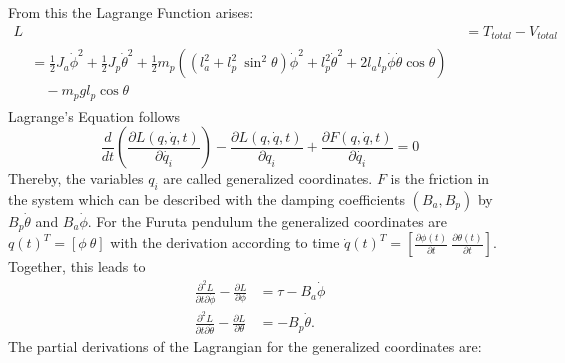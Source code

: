 From this the Lagrange Function arises:
\begin{align*}
L &=T_{total}-V_{total}\\
\begin{split}&=\frac{1}{2}J_a\dot{\phi}^2+\frac{1}{2}J_p\dot{\theta}^2+\frac{1}{2}m_p\left((l_a^2+l_p^2\
\sin^2\theta)\dot{\phi}^2+l_p^2\dot{\theta}^2+2l_al_p\dot{\phi}\dot{\theta}\cos 
\theta\right) \\&\quad - m_pgl_{p}\cos\theta\end{split}
\end{align*}
 Lagrange's 
Equation follows \[ 
\frac{d}{dt}\left(\frac{\partial L(q, \dot{q},t)}{\partial 
	\dot{q_i}}\right)-\frac{\partial 
	L(q, \dot{q},t)}{\partial 
	q_i}+\frac{\partial F(q, \dot{q}, t)}{\partial \dot{q_i}} =0\] Thereby, 
	the 
	variables 
	$q_i$ are called 
	generalized coordinates. $F$ is the friction in 
	the system which can be described with the damping coefficients 
	$(B_a, B_p)$ by $B_p\dot{\theta}$ and $ 
	B_a\dot{\phi}$.
	For 
the Furuta pendulum the generalized coordinates are $q(t)^T=[\phi \ \theta]$ 
with 
the derivation according to time $\dot{q}(t)^T = 
\left[\frac{\partial 
	\phi(t)}{\partial t}\ \frac{\partial \theta(t)}{\partial t} \right]$. 
	Together, this
	leads 
to 
\begin{align*}
\frac{\partial^2 L}{\partial t\partial \dot{\phi}}-\frac{\partial 
	L}{\partial \phi}&=\tau - B_a\dot{\phi}\\
\frac{\partial^2 L}{\partial t\partial \dot{\theta}}-\frac{\partial 
	L}{\partial \theta}&=-B_p\dot{\theta}.
\end{align*}
The partial derivations of the Lagrangian for the generalized coordinates are:


